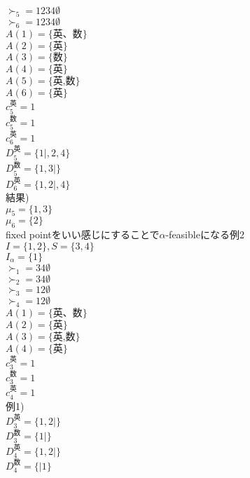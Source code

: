 \documentclass[a4j,10pt]{jsarticle}
\theoremstyle{definition}
\theoremstyle{remark}
\theoremstyle{plain}
\begin{document}
\begin{tcolorbox}[enhanced,breakable=true]
$\succ_5 = 1234\emptyset$\\
$\succ_6 = 1234\emptyset$\\
$A(1) = \{\text{英、数}\}$\\
$A(2) = \{\text{英}\}$\\
$A(3) = \{\text{数}\}$\\
$A(4) = \{\text{英}\}$\\

$A(5) = \{\text{英,数}\}$\\
$A(6) = \{\text{英}\}$\\

$c_5^{\text{英}} = 1$\\
$c_5^{\text{数}} = 1$\\
$c_6^{\text{英}} = 1$\\


$D_5^{\text{英}} = \{1|,2,4\}$\\
$D_5^{\text{数}} = \{1,3|\}$\\
$D_6^{\text{英}} = \{1,2|,4\}$\\

結果)\\
$\mu_5 = \{1,3\}$\\
$\mu_6 = \{2\}$\\

fixed pointをいい感じにすることで$\alpha$-feasibleになる例2\\
$I = \{1,2\}, S = \{3,4\}$\\
$I_\alpha = \{1\}$\\
$\succ_1 = 34\emptyset$\\
$\succ_2 = 34\emptyset$\\


$\succ_3 = 12\emptyset$\\
$\succ_4 = 12\emptyset$\\

$A(1) = \{\text{英、数}\}$\\
$A(2) = \{\text{英}\}$\\


$A(3) = \{\text{英,数}\}$\\
$A(4) = \{\text{英}\}$\\


$c_3^{\text{英}} = 1$\\
$c_3^{\text{数}} = 1$\\
$c_4^{\text{英}} = 1$\\

例1)\\
$D_3^{\text{英}} = \{1,2|\}$\\
$D_3^{\text{数}} = \{1|\}$\\
$D_4^{\text{英}} = \{1,2|\}$\\
$D_4^{\text{数}} = \{|1\}$\\


\end{tcolorbox}
\end{document}
